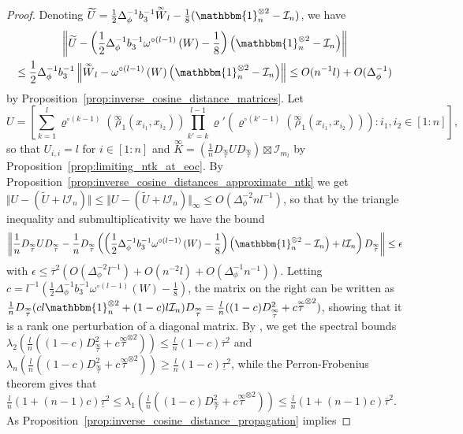 \documentclass[twoside,11pt]{article}
\newcommand{\Id}{\mathcal{I}}
\newcommand{\limiting}[1]{\overset{\scriptscriptstyle\infty}{#1}}
\begin{document}
\begin{proof}
Denoting $\widetilde{U} = \frac{1}{2} \Delta_\phi^{-1} b_3^{-1} \limiting{W}_l - \frac{1}{8} (\mathbbm{1}_n^{\otimes 2} - \Id_n)$, we have 
\begin{multline*}
\left\Vert \widetilde{U} - \left( \frac{1}{2} \Delta_\phi^{-1} b_3^{-1} \omega^{\circ (l-1)}\left( W \right) - \frac{1}{8} \right) \left( \mathbbm{1}_n^{\otimes 2} - \Id_n \right) \right\Vert \\
\leq \frac{1}{2} \Delta_\phi^{-1} b_3^{-1} \left\Vert \limiting{W}_l - \omega^{\circ (l-1)}\left( W \right) \left( \mathbbm{1}_n^{\otimes 2} - \Id_n \right) \right\Vert \leq O(n^{-1} l) + O(\Delta_\phi^{-1})
\end{multline*}
by Proposition~\ref{prop:inverse_cosine_distance_matrices}. Let 
\[
U = \left[ \sum_{k=1}^l \varrho^{\circ (k-1)}\left( \limiting{\rho}_1(x_{i_1},x_{i_2}) \right) \prod_{k'=k}^{l-1} \varrho'\left( \varrho^{\circ (k'-1)}\left( \limiting{\rho}_1(x_{i_1},x_{i_2}) \right) \right) : i_1,i_2 \in [1:n] \right],
\]
so that $U_{i,i} = l$ for $i \in [1:n]$ and $\limiting{K} = \left( \frac{1}{n} D_{\limiting{\tau}} U D_{\limiting{\tau}} \right) \boxtimes \Id_{m_l}$ by Proposition~\ref{prop:limiting_ntk_at_eoc}. By Proposition~\ref{prop:inverse_cosine_distances_approximate_ntk} we get $\Vert U - (\widetilde{U} + l \Id_n) \Vert \leq \Vert U - (\widetilde{U} + l \Id_n) \Vert_\infty \leq O(\Delta_\phi^{-2} n l^{-1})$, so that by the triangle inequality and submultiplicativity we have the bound
\[
\left\Vert \frac{1}{n} D_{\limiting{\tau}} U D_{\limiting{\tau}} - \frac{1}{n} D_{\limiting{\tau}} \left( \left( \frac{1}{2} \Delta_\phi^{-1} b_3^{-1} \omega^{\circ (l-1)}\left( W \right) - \frac{1}{8} \right) \left( \mathbbm{1}_n^{\otimes 2} - \Id_n \right) + l \Id_n \right) D_{\limiting{\tau}} \right\Vert 
\leq \epsilon
\]
with $\epsilon \leq \overline{\tau}^2 (O(\Delta_\phi^{-2} l^{-1}) + O(n^{-2} l) + O(\Delta_\phi^{-1} n^{-1}))$. Letting $c = l^{-1} ( \frac{1}{2} \Delta_\phi^{-1} b_3^{-1} \omega^{\circ (l-1)}( W ) - \frac{1}{8} )$, the matrix on the right can be written as $\frac{1}{n} D_{\limiting{\tau}} ( c l \mathbbm{1}_n^{\otimes 2} + (1 - c) l \Id_n ) D_{\limiting{\tau}} = \frac{l}{n} ((1-c) D_{\limiting{\tau}}^2 + c \limiting{\tau}^{\otimes 2})$, showing that it is a rank one perturbation of a diagonal matrix. By \citet[\S~1]{Jakovcevicetal2015}, we get the spectral bounds $\lambda_2(\frac{l}{n} ((1-c) D_{\limiting{\tau}}^2 + c \limiting{\tau}^{\otimes 2})) \leq \frac{l}{n} (1-c) \overline{\tau}^2$ and $\lambda_n(\frac{l}{n} ((1-c) D_{\limiting{\tau}}^2 + c \limiting{\tau}^{\otimes 2})) \geq \frac{l}{n} (1-c) \underline{\tau}^2$, while the Perron-Frobenius theorem gives that $\frac{l}{n} (1 + (n-1) c) \underline{\tau}^2 \leq \lambda_1(\frac{l}{n} ((1-c) D_{\limiting{\tau}}^2 + c \limiting{\tau}^{\otimes 2})) \leq \frac{l}{n} (1 + (n-1) c) \overline{\tau}^2$. As Proposition~\ref{prop:inverse_cosine_distance_propagation} implies

\end{proof}
\end{document}
